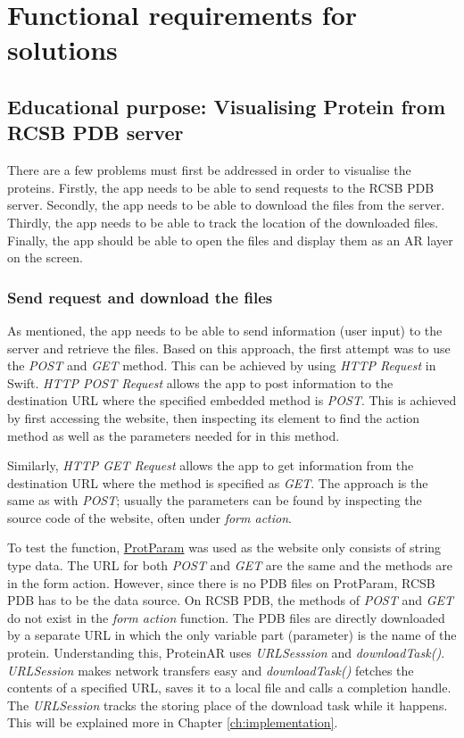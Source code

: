 \section{Functional requirements for solutions}
\subsection{Educational purpose: Visualising Protein from RCSB PDB server}
There are a few problems must first be addressed in order to visualise the proteins. 
Firstly, the app needs to be able to send requests to the RCSB PDB server. Secondly, the app needs to be able to download the files from the server. Thirdly, the app needs to be able to track the location of the downloaded files. Finally, the app should be able to open the files and display them as an AR layer on the screen. 
	\subsubsection{Send request and download the files}
As mentioned, the app needs to be able to send information (user input) to the server and retrieve the files. Based on this approach, the first attempt was to use the \emph{POST} and \emph{GET} method. This can be achieved by using \emph{HTTP Request} in Swift. 
\emph{HTTP POST Request} allows the app to post information to the destination URL where the specified embedded method is \emph{POST}. This is achieved by first accessing the website, then inspecting its element to find the action method as well as the parameters needed for in this method. 

Similarly, \emph{HTTP GET Request }allows the app to get information from the destination URL where the method is specified as \emph{GET}. The approach is the same as with \emph{POST}; usually the parameters can be found by inspecting the source code of the website, often under \emph{form action}.

To test the function, \href{https://web.expasy.org/protparam/}{ProtParam} was used as the website only consists of string type data. The URL for both \emph{POST} and \emph{GET} are the same and the methods are in the form action. However, since there is no PDB files on ProtParam, RCSB PDB has to be the data source. On RCSB PDB, the methods of \emph{POST} and \emph{GET} do not exist in the \emph{form action} function. The PDB files are directly downloaded by a separate URL in which the only variable part (parameter) is the name of the protein. Understanding this, ProteinAR uses \emph{URLSesssion} and \emph{downloadTask()}. \emph{URLSession} makes network transfers easy and \emph{downloadTask()} fetches the contents of a specified URL, saves it to a local file and calls a completion handle. The \emph{URLSession} tracks the storing place of the download task while it happens. This will be explained more in Chapter \ref{ch:implementation}.
	
